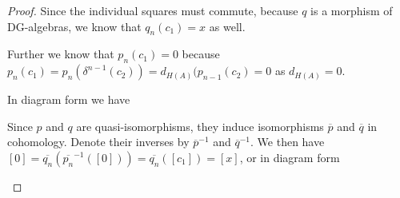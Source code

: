\begin{proof}
Since the individual squares must commute, because $q$ is a morphism of DG-algebras, we know that $q_{n}(c_1)=x$ as well. 

Further we know that $p_{n}(c_1)=0$ because $p_n(c_1)=p_n(\delta^{n-1}(c_2))=d_{H(A)}(p_{n-1}(c_2)=0$ as $d_{H(A)}=0$. 

In diagram form we have 
\begin{center}
\end{center}

Since $p$ and $q$ are quasi-isomorphisms, they induce isomorphisms $\overline{p}$ and $\overline{q}$ in cohomology. Denote their inverses by $\overline{p}^{-1}$ and $\overline{q}^{-1}$. We then have $[0]=\overline{q_{n}}(\overline{p_n}^{-1}([0])) = \overline{q_n}([c_1])=[x]$, or in diagram form
\begin{center}
\end{center}
\end{proof}
\fi